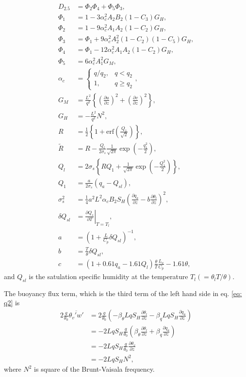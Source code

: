 \begin{align}
  D_{2.5} &= \Phi_2\Phi_4 + \Phi_5\Phi_3, \\
  \Phi_1 &= 1-3\alpha_c^2A_2B_2(1-C_3)G_H, \\
  \Phi_2 &= 1-9\alpha_c^2A_1A_2(1-C_2)G_H, \\
  \Phi_3 &= \Phi_1+9\alpha_c^2A_2^2(1-C_2)(1-C_5)G_H, \\
  \Phi_4 &= \Phi_1-12\alpha_c^2A_1A_2(1-C_2)G_H, \\
  \Phi_5 &= 6\alpha_c^2A_1^2G_M, \\
  \alpha_c &= \left\{
  \begin{array}{ll}
    q/q_2, & q<q_2 \\
    1, & q \ge q_2
  \end{array}
  \right. , \\
  G_M &= \frac{L^2}{q^2}\left\{\left(\frac{\partial u}{\partial z}\right)^2 + \left(\frac{\partial v}{\partial z}\right)^2\right\}, \\
  G_H &= -\frac{L^2}{q^2}N^2, \\
  R &= \frac{1}{2}\left\{1+\mathrm{erf}\left(\frac{Q_1}{\sqrt{2}}\right)\right\}, \\
  \tilde{R} &= R - \frac{Q_l}{2\sigma_s}\frac{1}{\sqrt{2\pi}}\exp\left(-\frac{q_1^2}{2}\right), \\
  Q_l &= 2\sigma_s\left\{RQ_1+\frac{1}{\sqrt{2\pi}}\exp\left(-\frac{Q_1^2}{2}\right)\right\}, \\
  Q_1 &= \frac{a}{2\sigma_s}(q_a-Q_{sl}), \\
  \sigma_s^2 &= \frac{1}{4}a^2L^2\alpha_cB_2S_H\left(\frac{\partial q_a}{\partial z} -b\frac{\partial \theta_l}{\partial z}\right)^2, \\
  \delta Q_{sl} &= \left.\frac{\partial Q_s}{\partial T}\right|_{T=T_l}, \\
  a &= \left(1+\frac{L}{C_p}\delta Q_{sl}\right)^{-1}, \\
  b &= \frac{T}{\theta}\delta Q_{sl}, \\
  c &= (1+0.61q_a - 1.61Q_l)\frac{\theta}{T}\frac{L_v}{C_p} - 1.61\theta,
\end{align}
and $Q_{sl}$ is the satulation specific humidity at the temperature $T_l (=\theta_l T/\theta)$.

The buoyancy flux term, which is the third term of the left hand side in eq. \ref{eq: q2} is
\begin{align}
  2\frac{g}{\theta_0}\overline{\theta_v' w'}
  &= 2\frac{g}{\theta_0}\left(-\beta_\theta LqS_H\frac{\partial \theta_l}{\partial z} - \beta_q LqS_H\frac{\partial q_a}{\partial z}\right) \nonumber \\
  &= -2LqS_H\frac{g}{\theta_0}\left(\beta_\theta\frac{\partial \theta_l}{\partial z}+\beta_q\frac{\partial q_a}{\partial z}\right) \nonumber \\
  &= -2LqS_H\frac{g}{\theta_0}\frac{\partial \theta_v}{\partial z} \nonumber \\
  &= -2LqS_HN^2,
\end{align}
where $N^2$ is square of the Brunt-Vaisala frequency.


